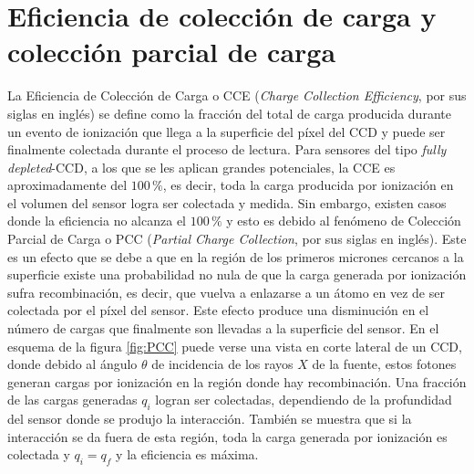\section{Eficiencia de colección de carga y colección parcial de carga}
\noindent La Eficiencia de Colección de Carga o CCE (\textit{Charge Collection Efficiency}, por sus siglas en inglés) se define como la fracción del total de carga producida durante un evento de ionización que llega a la superficie del píxel del CCD y puede ser finalmente colectada durante el proceso de lectura. Para sensores del tipo \textit{fully depleted}-CCD\cite{osti_838066}, a los que se les aplican grandes potenciales, la CCE es aproximadamente del $100\,\%$, es decir, toda la carga producida por ionización en el volumen del sensor logra ser colectada y medida. Sin embargo, existen casos donde la eficiencia no alcanza el $100\,\%$ y esto es debido al fenómeno de Colección Parcial de Carga o PCC (\textit{Partial Charge Collection}, por sus siglas en inglés)\cite{PCC-CCE}. Este es un efecto que se debe a que en la región de los primeros micrones cercanos a la superficie existe una probabilidad no nula de que la carga generada por ionización sufra recombinación, es decir, que vuelva a enlazarse a un átomo en vez de ser colectada por el píxel del sensor. Este efecto produce una disminución en el número de cargas que finalmente son llevadas a la superficie del sensor. En el esquema de la figura \ref{fig:PCC} puede verse una vista en corte lateral de un CCD, donde debido al ángulo $\theta$ de incidencia de los rayos $X$ de la fuente, estos fotones generan cargas por ionización en la región donde hay recombinación. Una fracción de las cargas generadas $q_{i}$ logran ser colectadas, dependiendo de la profundidad del sensor donde se produjo la interacción. También se muestra que si la interacción se da fuera de esta región, toda la carga generada por ionización es colectada y $q_{i} = q_{f}$ y la eficiencia es máxima.
